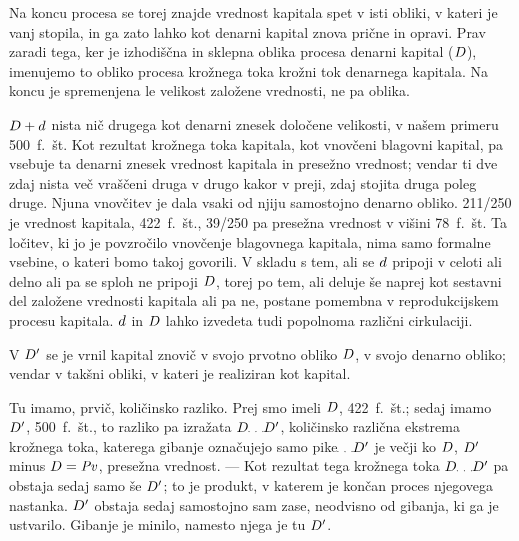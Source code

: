 \documentclass[kapital_02.tex]{subfiles}
\begin{document}
Na koncu procesa se torej znajde vrednost kapitala spet v isti obliki, v kateri je vanj stopila, in ga zato lahko kot denarni kapital znova prične in opravi. Prav zaradi tega, ker je izhodiščna in sklepna oblika procesa denarni kapital (\(D\)), imenujemo to obliko procesa krožnega toka krožni tok denarnega kapitala. Na koncu je spremenjena le velikost založene vrednosti, ne pa oblika.

\(D + d\) nista nič drugega kot denarni znesek določene velikosti, v našem primeru 500~f.~št. Kot rezultat krožnega toka kapitala, kot vnovčeni blagovni kapital, pa vsebuje ta denarni znesek vrednost kapitala in presežno vrednost; vendar ti dve zdaj nista več vraščeni druga v drugo kakor v preji, zdaj stojita druga poleg druge. Njuna vnovčitev je dala vsaki od njiju samostojno denarno obliko. 211/250 je vrednost kapitala, 422~f.~št., 39/250 pa presežna vrednost v višini 78~f.~št. Ta ločitev, ki jo je povzročilo vnovčenje blagovnega kapitala, nima samo formalne vsebine, o kateri bomo takoj govorili. V skladu s tem, ali se \(d\) pripoji v celoti ali delno ali pa se sploh ne pripoji \(D\), torej po tem, ali deluje še naprej kot sestavni del založene vrednosti kapitala ali pa ne, postane pomembna v reprodukcijskem procesu kapitala. \(d\) in \(D\) lahko izvedeta tudi popolnoma različni cirkulaciji.

V \(D'\) se je vrnil kapital znovič v svojo prvotno obliko \(D\), v svojo denarno obliko; vendar v takšni obliki, v kateri je realiziran kot kapital.

Tu imamo, prvič, količinsko razliko. Prej smo imeli \(D\), 422~f.~št.; sedaj imamo \(D'\), 500~f.~št., to razliko pa izražata \(\KPED\KPEpike\KPED'\), količinsko različna ekstrema krožnega toka, katerega gibanje označujejo samo pike\(\KPEpike\KPED'\) je večji ko \(D\), \(D'\) minus \(D = \mathit{Pv}\), presežna vrednost. --- Kot rezultat tega krožnega toka \(\KPED\KPEpike\KPED'\) pa obstaja sedaj samo še \(D'\); to je produkt, v katerem je končan proces njegovega nastanka. \(D'\) obstaja sedaj samostojno sam zase, neodvisno od gibanja, ki ga je ustvarilo. Gibanje je minilo, namesto njega je tu \(D'\).
\end{document}
